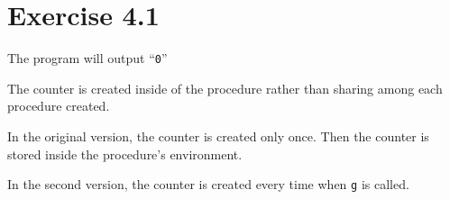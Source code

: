 \section*{Exercise 4.1}

The program will output ``\texttt{0}''

The counter is created inside of the procedure
rather than sharing among each procedure created.

In the original version, the counter is created only once.
Then the counter is stored
inside the procedure's environment.

In the second version, the counter is created every time
when \texttt{g} is called.
